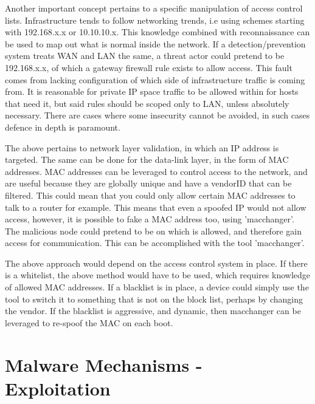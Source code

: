 Another important concept pertains to a specific manipulation of access control lists. Infrastructure tends to follow networking trends, i.e using schemes starting with 192.168.x.x or 10.10.10.x. This knowledge combined with reconnaissance can be used to map out what is normal inside the network.
If a detection/prevention system treats WAN and LAN the same, a threat actor could pretend to be 192.168.x.x, of which a gateway firewall rule exists to allow access. This fault comes from lacking configuration of which side of infrastructure traffic is coming from. 
It is reasonable for private IP space traffic to be allowed within for hosts that need it, but said rules should be scoped only to LAN, unless absolutely necessary. There are cases where some insecurity cannot be avoided, in such cases defence in depth is paramount.

The above pertains to network layer validation, in which an IP address is targeted. The same can be done for the data-link layer, in the form of MAC addresses. MAC addresses can be leveraged to control access to the network, and are useful because they are globally unique and have a vendorID that can be filtered.
This could mean that you could only allow certain MAC addresses to talk to a router for example. This means that even a spoofed IP would not allow access, however, it is possible to fake a MAC address too, using 'macchanger'. The malicious node could pretend to be on which is allowed, and therefore gain access for communication. 
This can be accomplished with the tool 'macchanger'. \citep{IPMACSpoofing}

The above approach would depend on the access control system in place. If there is a whitelist, the above method would have to be used, which requires knowledge of allowed MAC addresses. If a blacklist is in place, a device could simply use the tool to switch it to something that is not on the block list, perhaps by changing the vendor. If the blacklist is aggressive, and dynamic, then macchanger can be leveraged to re-spoof the MAC on each boot.


\chapter{Malware Mechanisms - Exploitation}

